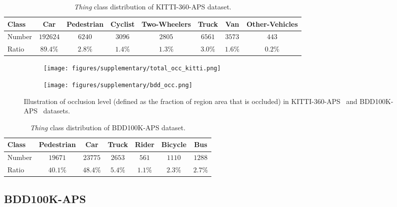\documentclass[10pt,twocolumn,letterpaper]{article}
\begin{document}
\begin{table*}
\footnotesize 
\centering
\begin{tabular}{l|ccccccc}
\toprule
Class & Car & Pedestrian & Cyclist & Two-Wheelers & Truck & Van & Other-Vehicles \\
\midrule
 Number & $192624$ & $6240$ &  $3096$ & $2805$ & $6561$ & $3573$ & $443$  \\
 Ratio & $89.4\%$ & $2.8\%$ &  $1.4\%$ & $1.3\%$ & $3.0\%$ & $1.6\%$ & $0.2\%$ \\
\bottomrule
\end{tabular}
\caption{\textit{Thing} class distribution of KITTI-360-APS dataset.}
\label{tab:thingdist}
\end{table*}

\begin{figure}
    \centering
    \begin{subfigure}[b]{\linewidth}
        \centering
        \texttt{[image: figures/supplementary/total\_occ\_kitti.png]}
        \label{occ_kitti}
    \end{subfigure}
    \begin{subfigure}[b]{\linewidth}
        \centering 
        \texttt{[image: figures/supplementary/bdd\_occ.png]}
        \label{occ_bdd}
    \end{subfigure}
    \caption{Illustration of occlusion level (defined as the fraction of region area that is occluded) in KITTI-360-APS~ and BDD100K-APS~ datasets. }
    \label{fig:occ}
\end{figure}

\begin{table*}
\footnotesize 
\centering
\begin{tabular}{l|cccccc}
\toprule
Class & Pedestrian & Car & Truck & Rider & Bicycle & Bus \\
\midrule
 Number & $19671$ & $23775$ &  $2653$ & $561$ & $1110$ & $1288$  \\
 Ratio & $40.1\%$ & $48.4\%$ &  $5.4\%$ & $1.1\%$ & $2.3\%$ & $2.7\%$  \\
\bottomrule
\end{tabular}
\caption{\textit{Thing} class distribution of BDD100K-APS dataset.}
\label{tab:thingdistbdd}
\end{table*}

\subsection{BDD100K-APS}
\end{document}
